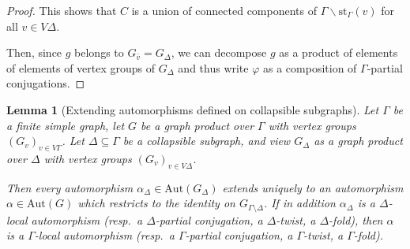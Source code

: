 \documentclass[a4paper,english,11pt]{article}
\newtheorem{lemma}[de]{Lemma}
\theoremstyle{definition}
\theoremstyle{remark}
\newcommand{\st}{\mathrm{st}}
\newcommand{\Aut}{\mathrm{Aut}}
\begin{document}
\begin{proof}
This shows that $C$ is a union of connected components of $\Gamma\backslash \st_{\Gamma}(v)$ for all $v\in V\Delta$.

Then, since $g$ belongs to $G_{\bar{v}}=G_{\Delta}$, we can decompose $g$ as a product of elements of elements of vertex groups of $G_{\Delta}$ and thus write $\varphi$ as a composition of $\Gamma$-partial conjugations.
\end{proof}

\begin{lemma}[Extending automorphisms defined on collapsible subgraphs]\label{Lmm:Extending-aut-defined-on-collapsible}
Let $\Gamma$ be a finite simple graph, let $G$ be a graph product over $\Gamma$ with vertex groups $(G_v)_{v\in V\Gamma}$. Let $\Delta\subseteq\Gamma$ be a collapsible subgraph, and view $G_{\Delta}$ as a graph product over $\Delta$ with vertex groups $(G_v)_{v\in V\Delta}$. 

Then every automorphism $\alpha_\Delta\in\Aut(G_\Delta)$ extends uniquely to an automorphism $\alpha\in\Aut(G)$ which restricts to the identity on $G_{\Gamma\setminus\Delta}$. If in addition $\alpha_\Delta$ is a $\Delta$-local automorphism (resp.\ a $\Delta$-partial conjugation, a $\Delta$-twist, a $\Delta$-fold), then $\alpha$ is a $\Gamma$-local automorphism (resp.\ a $\Gamma$-partial conjugation, a $\Gamma$-twist, a $\Gamma$-fold). 
\end{lemma}
\end{document}
